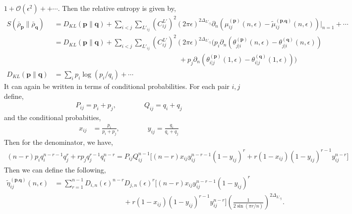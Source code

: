 \documentclass[11pt]{article}
\newcommand{\ep}{\epsilon}
\newcommand{\p}{\partial}
\newcommand{\mO}{\mathcal{O}}
\newcommand{\nn}{\nonumber}
\newcommand{\lb}{\left(}
\newcommand{\rb}{\right)}
\begin{document}
$1+ \mO(\ep^2) ++ \cdots$. 
Then the relative entropy is given by,
\begin{align}
    S(\bar{\rho}_\textbf{p}\| \bar{\rho}_\textbf{q}) &= D_{KL}(\textbf{p}\|\textbf{q}) +  \sum_{i<j}\sum_{L'_{ij}}\lb C_{ij}^{L'}\rb^2 (2\pi\ep)^{2\Delta_{L'_{ij}}} \p_n \lb\mu_{ij}^{(\textbf{p})}(n,\ep)- \tilde{\mu}_{ij}^{(\textbf{p,q})}(n,\ep)\rb\Big|_{n=1}+\cdots\\
    &= D_{KL}(\textbf{p}\|\textbf{q}) + \sum_{i<j}\sum_{L'_{ij}}\lb C_{ij}^{L'}\rb^2 (2\pi\ep)^{2\Delta_{L'_{ij}}} \Bigg(p_i \p_n \lb  \theta_{j|i}^{(\textbf{p})} (n,\ep)-\theta_{j|i}^{(\textbf{q})} (n,\ep )\rb 
    \nn\\
    &\qquad \qquad\qquad \qquad \qquad\qquad \qquad\qquad\qquad  
    + p_j\p_n \lb\theta_{i|j}^{(\textbf{p})} (1,\ep )-\theta_{i|j}^{(\textbf{q})} (1,\ep )\rb \Bigg)\\
     D_{KL}(\textbf{p}\|\textbf{q}) &= \sum_i p_i \log(p_i/q_i) +\cdots
\end{align}
It can again be written in terms of conditional probabilities. For each pair $i,j$ define,
\begin{align}
    P_{ij} = p_i + p_j, \qquad \qquad Q_{ij} = q_i + q_j
\end{align}
and the conditional probabities,
\begin{align}
    x_{ij} &= \frac{p_i}{p_i + p_j}, \qquad \qquad y_{ij} = \frac{q_i}{q_i + q_j}
\end{align}
Then for the denominator, we have,
\begin{align}
    (n-r)p_i q_i^{n-r-1}q_j^r + rp_j q_j^{r-1}q_i^{n-r} = P_{ij} Q_{ij}^{n-1}\big[ (n-r)x_{ij}y_{ij}^{n-r-1}(1-y_{ij})^r + r(1-x_{ij}) (1-y_{ij})^{r-1}y_{ij}^{n-r} \big]
\end{align}
Then we can define the following,
\begin{align}
    \tilde\eta_{ij}^{(\textbf{p,q})}(n,\ep) &= 
    \sum_{r=1}^{n-1} D_{i,n}(\ep)^{n-r}D_{j,n}(\ep)^r\Big[ (n-r)x_{ij}y_{ij}^{n-r-1}(1-y_{ij})^r \nn\\&\qquad \qquad\qquad\qquad\qquad + r(1-x_{ij}) (1-y_{ij})^{r-1}y_{ij}^{n-r} \Big] \lb\frac{1}{2\sin (\pi r/n)}\rb^{2\Delta_{L'_{ij}}} .
\end{align}
\end{document}
